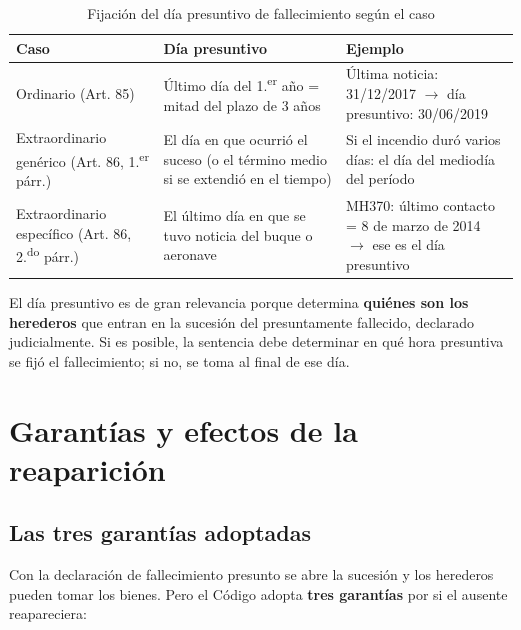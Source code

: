 \documentclass[12pt,oneside]{book}
\begin{document}
\begin{table}[H]
\centering
\begin{tabularx}{\textwidth}{>{\raggedright\arraybackslash}X >{\raggedright\arraybackslash}X >{\raggedright\arraybackslash}X}
\toprule
\textbf{Caso} & \textbf{Día presuntivo} & \textbf{Ejemplo} \\
\midrule
Ordinario (Art. 85) & Último día del 1.\textsuperscript{er} año = mitad del plazo de 3 años & Última noticia: 31/12/2017 $\rightarrow$ día presuntivo: 30/06/2019 \\
Extraordinario genérico (Art. 86, 1.\textsuperscript{er} párr.) & El día en que ocurrió el suceso (o el término medio si se extendió en el tiempo) & Si el incendio duró varios días: el día del mediodía del período \\
Extraordinario específico (Art. 86, 2.\textsuperscript{do} párr.) & El último día en que se tuvo noticia del buque o aeronave & MH370: último contacto = 8 de marzo de 2014 $\rightarrow$ ese es el día presuntivo \\
\bottomrule
\end{tabularx}
\caption{Fijación del día presuntivo de fallecimiento según el caso}
\end{table}

El día presuntivo es de gran relevancia porque determina
\textbf{quiénes son los herederos} que entran en la sucesión del
presuntamente fallecido, declarado judicialmente. Si es posible, la
sentencia debe determinar en qué hora presuntiva se fijó el
fallecimiento; si no, se toma al final de ese día.

\chapter{Garantías y efectos de la reaparición}

\section{Las tres garantías adoptadas}

Con la declaración de fallecimiento presunto se abre la sucesión y los
herederos pueden tomar los bienes. Pero el Código adopta \textbf{tres
garantías} por si el ausente reapareciera:
\end{document}
